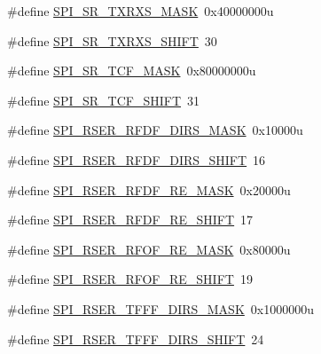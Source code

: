 \begin{DoxyCompactItemize}
\item 
\#define \hyperlink{group___s_p_i___register___masks_ga82001e6d6fa1c1e51ab330a4d6b209c5}{S\+P\+I\+\_\+\+S\+R\+\_\+\+T\+X\+R\+X\+S\+\_\+\+M\+A\+SK}~0x40000000u
\item 
\#define \hyperlink{group___s_p_i___register___masks_ga596b82d7dd4fe7f24ea66c19a9413b96}{S\+P\+I\+\_\+\+S\+R\+\_\+\+T\+X\+R\+X\+S\+\_\+\+S\+H\+I\+FT}~30
\item 
\#define \hyperlink{group___s_p_i___register___masks_ga3142ac7389c847b78c8f42e6bad5eec1}{S\+P\+I\+\_\+\+S\+R\+\_\+\+T\+C\+F\+\_\+\+M\+A\+SK}~0x80000000u
\item 
\#define \hyperlink{group___s_p_i___register___masks_ga4edd10f93f07c7b2edfbac31c1d4ebf5}{S\+P\+I\+\_\+\+S\+R\+\_\+\+T\+C\+F\+\_\+\+S\+H\+I\+FT}~31
\item 
\#define \hyperlink{group___s_p_i___register___masks_ga10709e9e15464e94d63f2034df58cd32}{S\+P\+I\+\_\+\+R\+S\+E\+R\+\_\+\+R\+F\+D\+F\+\_\+\+D\+I\+R\+S\+\_\+\+M\+A\+SK}~0x10000u
\item 
\#define \hyperlink{group___s_p_i___register___masks_ga1abe68cebab13a4018f43162098e4cd6}{S\+P\+I\+\_\+\+R\+S\+E\+R\+\_\+\+R\+F\+D\+F\+\_\+\+D\+I\+R\+S\+\_\+\+S\+H\+I\+FT}~16
\item 
\#define \hyperlink{group___s_p_i___register___masks_ga5b78af7a1292fc0e0b4b39a92a4140b2}{S\+P\+I\+\_\+\+R\+S\+E\+R\+\_\+\+R\+F\+D\+F\+\_\+\+R\+E\+\_\+\+M\+A\+SK}~0x20000u
\item 
\#define \hyperlink{group___s_p_i___register___masks_ga39481cbcda158bbfc6640eb07d0c2276}{S\+P\+I\+\_\+\+R\+S\+E\+R\+\_\+\+R\+F\+D\+F\+\_\+\+R\+E\+\_\+\+S\+H\+I\+FT}~17
\item 
\#define \hyperlink{group___s_p_i___register___masks_ga32d8083bb571fb12a424b1803c596f47}{S\+P\+I\+\_\+\+R\+S\+E\+R\+\_\+\+R\+F\+O\+F\+\_\+\+R\+E\+\_\+\+M\+A\+SK}~0x80000u
\item 
\#define \hyperlink{group___s_p_i___register___masks_gab18f888cf02c471809ebc9f807711a13}{S\+P\+I\+\_\+\+R\+S\+E\+R\+\_\+\+R\+F\+O\+F\+\_\+\+R\+E\+\_\+\+S\+H\+I\+FT}~19
\item 
\#define \hyperlink{group___s_p_i___register___masks_ga01228112dcc4440aa1678eb55b97306e}{S\+P\+I\+\_\+\+R\+S\+E\+R\+\_\+\+T\+F\+F\+F\+\_\+\+D\+I\+R\+S\+\_\+\+M\+A\+SK}~0x1000000u
\item 
\#define \hyperlink{group___s_p_i___register___masks_ga9f1684fdb2e7f9e9adb7afd07a3278da}{S\+P\+I\+\_\+\+R\+S\+E\+R\+\_\+\+T\+F\+F\+F\+\_\+\+D\+I\+R\+S\+\_\+\+S\+H\+I\+FT}~24
\item 

\end{DoxyCompactItemize}
